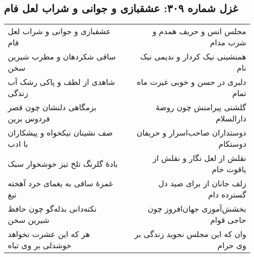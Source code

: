 \begin{center}
\section*{غزل شماره ۳۰۹: عشقبازی و جوانی و شراب لعل فام}
\label{sec:sh309}
\begin{longtable}{l p{0.5cm} r}
عشقبازی و جوانی و شراب لعل فام
&&
مجلس انس و حریف همدم و شرب مدام
\\
ساقی شکردهان و مطرب شیرین سخن
&&
همنشینی نیک کردار و ندیمی نیک نام
\\
شاهدی از لطف و پاکی رشک آب زندگی
&&
دلبری در حسن و خوبی غیرت ماه تمام
\\
بزمگاهی دلنشان چون قصر فردوس برین
&&
گلشنی پیرامنش چون روضهٔ دارالسلام
\\
صف نشینان نیکخواه و پیشکاران با ادب
&&
دوستداران صاحب‌اسرار و حریفان دوستکام
\\
بادهٔ گلرنگ تلخ تیز خوشخوار سبک
&&
نقلش از لعل نگار و نقلش از یاقوت خام
\\
غمزهٔ ساقی به یغمای خرد آهخته تیغ
&&
زلف جانان از برای صید دل گسترده دام
\\
نکته‌دانی بذله‌گو چون حافظ شیرین سخن
&&
بخشش‌آموزی جهان‌افروز چون حاجی قوام
\\
هر که این عشرت نخواهد خوشدلی بر وی تباه
&&
وان که این مجلس نجوید زندگی بر وی حرام
\\
\end{longtable}
\end{center}
